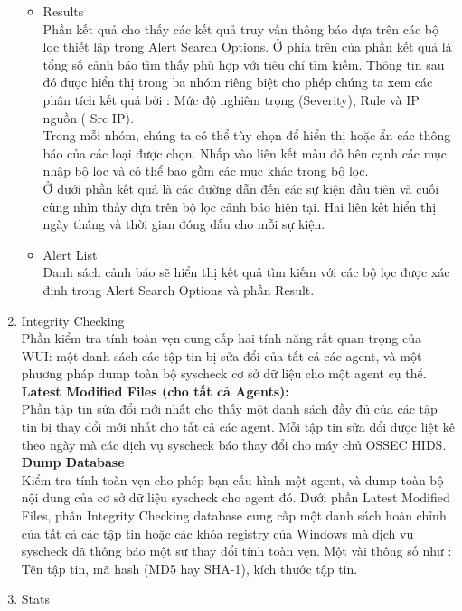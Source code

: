 \begin{enumerate}
\begin{itemize}
     \item Results\\
     Phần kết quả cho thấy các kết quả truy vấn thông báo dựa trên các bộ lọc
     thiết lập trong Alert Search Options. Ở phía trên của phần kết quả là tổng
     số cảnh báo tìm thấy phù hợp với tiêu chí tìm kiếm. Thông tin sau đó được
     hiển thị trong ba nhóm riêng biệt cho phép chúng ta xem các phân tích kết quả bởi : Mức độ nghiêm trọng (Severity), Rule và IP nguồn ( Src IP).\\
     Trong mỗi nhóm, chúng ta có thể tùy chọn để hiển thị hoặc ẩn các thông báo
     của các loại được chọn. Nhấp vào liên kết màu đỏ bên cạnh các mục nhập bộ
     lọc và có thể bao gồm các mục khác trong bộ lọc.\\
     Ở dưới phần kết quả là các đường dẫn đến các sự kiện đầu tiên và cuối cùng
     nhìn thấy dựa trên bộ lọc cảnh báo hiện tại. Hai liên kết hiển thị ngày tháng và thời gian đóng dấu cho mỗi sự kiện.
     \item Alert List\\
     Danh sách cảnh báo sẽ hiển thị kết quả tìm kiếm với các bộ lọc được xác
     định trong Alert Search Options và phần Result.
   \end{itemize}
   \item Integrity Checking\\
   Phần kiểm tra tính toàn vẹn cung cấp hai tính năng rất quan trọng của WUI:
   một danh sách các tập tin bị sửa đổi của tất cả các agent, và một phương pháp
   dump toàn bộ syscheck cơ sở dữ liệu cho một agent cụ thể.\\
   \textbf{Latest Modified Files (cho tất cả Agents):}\\ 
Phần tập tin sửa đổi mới nhất cho thấy một danh sách đầy đủ của các tập tin bị
thay đổi mới nhất cho tất cả các agent. Mỗi tập tin sửa đổi được liệt kê theo
ngày mà các dịch vụ syscheck báo thay đổi cho máy chủ OSSEC HIDS.\\
	\textbf{Dump Database}\\
	Kiểm tra tính toàn vẹn cho phép bạn cấu hình một agent, và dump toàn bộ nội
	dung của cơ sở dữ liệu syscheck cho agent đó. Dưới phần Latest Modified Files,
	phần Integrity Checking database cung cấp một danh sách hoàn chỉnh của tất cả
	các tập tin hoặc các khóa registry của Windows mà dịch vụ syscheck đã thông báo
	một sự thay đổi tính toàn vẹn. Một vài thông số như : Tên tập tin, mã hash (MD5 hay SHA-1), kích thước tập tin.
	\item Stats\\

\end{enumerate}
